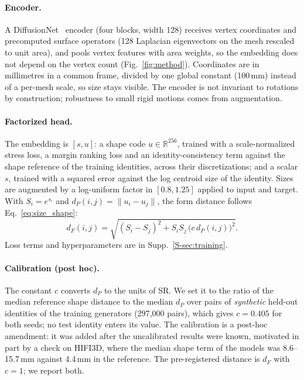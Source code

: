 \documentclass[10pt,twocolumn,letterpaper]{article}
\begin{document}
\paragraph{Encoder.} A DiffusionNet~\cite{diffusionet} encoder (four blocks, width 128) receives vertex coordinates and precomputed surface operators (128 Laplacian eigenvectors on the mesh rescaled to unit area), and pools vertex features with area weights, so the embedding does not depend on the vertex count (Fig.~\ref{fig:method}). Coordinates are in millimetres in a common frame, divided by one global constant (100\,mm) instead of a per-mesh scale, so size stays visible. The encoder is not invariant to rotations by construction; robustness to small rigid motions comes from augmentation.

\paragraph{Factorized head.} The embedding is $[s,u]$: a shape code $u\in\mathbb R^{256}$, trained with a scale-normalized stress loss, a margin ranking loss and an identity-consistency term against the shape reference of the training identities, across their discretizations; and a scalar $s$, trained with a squared error against the log centroid size of the identity. Sizes are augmented by a log-uniform factor in $[0.8,1.25]$ applied to input and target. With $S_i=e^{s_i}$ and $d_P(i,j)=\|u_i-u_j\|$, the form distance follows Eq.~\eqref{eq:size_shape}:
\begin{equation}
d_F(i,j)=\sqrt{(S_i-S_j)^2+S_iS_j\,\big(c\,d_P(i,j)\big)^2}.
\label{eq:factorized}
\end{equation}
Loss terms and hyperparameters are in Supp.~\ref{S-sec:training}.

\paragraph{Calibration (post hoc).} The constant $c$ converts $d_P$ to the units of SR. We set it to the ratio of the median reference shape distance to the median $d_P$ over pairs of \emph{synthetic} held-out identities of the training generators (297{,}000 pairs), which gives $c=0.405$ for both seeds; no test identity enters its value. The calibration is a post-hoc amendment: it was added after the uncalibrated results were known, motivated in part by a check on HIFI3D, where the median shape term of the models was 8.6--15.7\,mm against 4.4\,mm in the reference. The pre-registered distance is $d_F$ with $c=1$; we report both.
\end{document}

